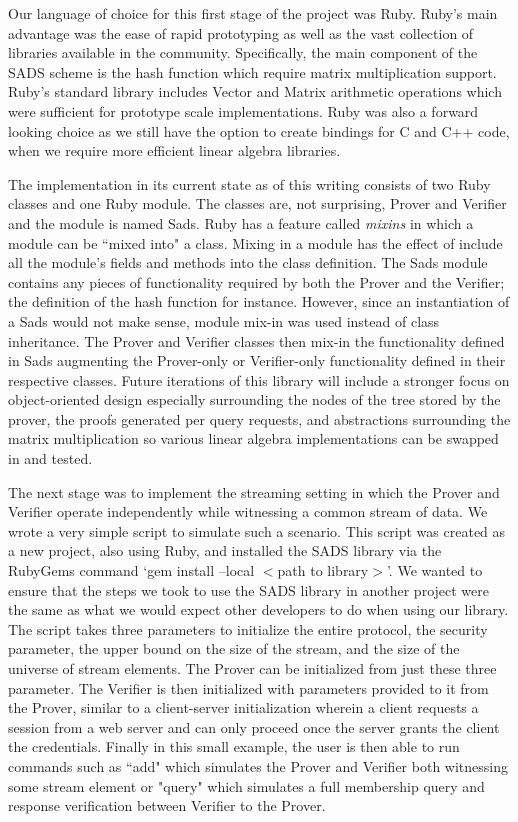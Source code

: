 \documentclass[11pt, letterpaper, oneside]{article}
\begin{document}
	Our language of choice for this first stage of the project was Ruby.
	Ruby's main advantage was the ease of rapid prototyping as well as the vast collection of libraries available in the community.
	Specifically, the main component of the SADS scheme is the hash function which require matrix multiplication support.
	Ruby's standard library includes Vector and Matrix arithmetic operations which were sufficient for prototype scale implementations.
	Ruby was also a forward looking choice as we still have the option to create bindings for C and C++ code, when we require more efficient linear algebra libraries.

	The implementation in its current state as of this writing consists of two Ruby classes and one Ruby module.
	The classes are, not surprising, Prover and Verifier and the module is named Sads.
	Ruby has a feature called \textit{mixins} in which a module can be ``mixed into" a class.
	Mixing in a module has the effect of include all the module's fields and methods into the class definition.
	The Sads module contains any pieces of functionality required by both the Prover and the Verifier; the definition of the hash function for instance.
	However, since an instantiation of a Sads would not make sense, module mix-in was used instead of class inheritance.
	The Prover and Verifier classes then mix-in the functionality defined in Sads augmenting the Prover-only or Verifier-only functionality defined in their respective classes.
		Future iterations of this library will include a stronger focus on object-oriented design especially surrounding the nodes of the tree stored by the prover, the proofs generated per query requests, and abstractions surrounding the matrix multiplication so various linear algebra implementations can be swapped in and tested.

	The next stage was to implement the streaming setting in which the Prover and Verifier operate independently while witnessing a common stream of data.
	We wrote a very simple script to simulate such a scenario.
	This script was created as a new project, also using Ruby, and installed the SADS library via the RubyGems command `gem install --local $<$path to library$>$'.
	We wanted to ensure that the steps we took to use the SADS library in another project were the same as what we would expect other developers to do when using our library.
	The script takes three parameters to initialize the entire protocol, the security parameter, the upper bound on the size of the stream, and the size of the universe of stream elements.
	The Prover can be initialized from just these three parameter.
	The Verifier is then initialized with parameters provided to it from the Prover, similar to a client-server initialization wherein a client requests a session from a web server and can only proceed once the server grants the client the credentials.
	Finally in this small example, the user is then able to run commands such as ``add" which simulates the Prover and Verifier both witnessing some stream element or "query" which simulates a full membership query and response verification between Verifier to the Prover.
\end{document}
